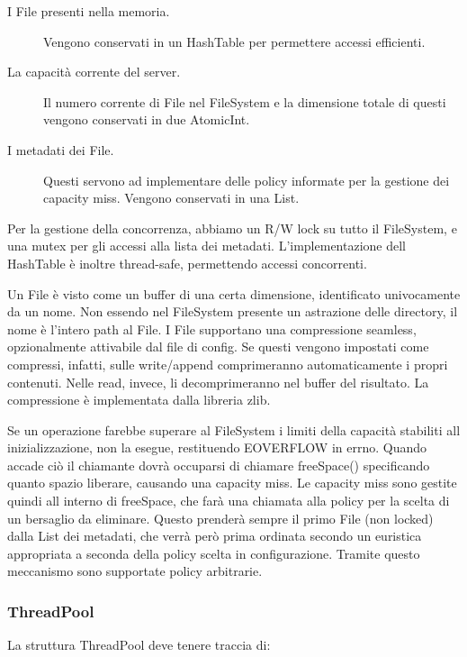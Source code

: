 \documentclass[11pt]{article}
\begin{document}
\begin{flushleft}
\begin{description}
\item[I File presenti nella memoria.] Vengono conservati in un HashTable per permettere accessi efficienti.

\item[La capacità corrente del server.] Il numero corrente di File nel FileSystem e la dimensione totale di questi vengono conservati in due AtomicInt.

\item[I metadati dei File.] Questi servono ad implementare delle policy informate per la gestione dei capacity miss. Vengono conservati in una List.

\end{description}

Per la gestione della concorrenza, abbiamo un R/W lock su tutto il FileSystem, e una mutex per gli accessi alla lista dei metadati. L'implementazione dell HashTable è inoltre thread-safe, permettendo accessi concorrenti.

Un File è visto come un buffer di una certa dimensione, identificato univocamente da un nome. Non essendo nel FileSystem presente un astrazione delle directory, il nome è l'intero path al File.
I File supportano una compressione seamless, opzionalmente attivabile dal file di config. Se questi vengono impostati come compressi, infatti, sulle write/append comprimeranno automaticamente i propri contenuti. Nelle read, invece, li decomprimeranno nel buffer del risultato. La compressione è implementata dalla libreria zlib.

Se un operazione farebbe superare al FileSystem i limiti della capacità stabiliti all inizializzazione, non la esegue, restituendo EOVERFLOW in errno. Quando accade ciò il chiamante dovrà occuparsi di chiamare freeSpace() specificando quanto spazio liberare, causando una capacity miss.
Le capacity miss sono gestite quindi all interno di freeSpace, che farà una chiamata alla policy per la scelta di un bersaglio da eliminare. Questo prenderà sempre il primo File (non locked) dalla List dei metadati, che verrà però prima ordinata secondo un euristica appropriata a seconda della policy scelta in configurazione. Tramite questo meccanismo sono supportate policy arbitrarie.

\subsubsection{ThreadPool}

La struttura ThreadPool deve tenere traccia di:
\begin{description}


\end{description}
\end{flushleft}
\end{document}
